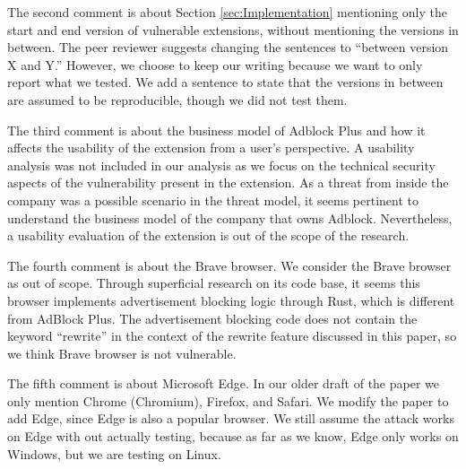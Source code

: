 \documentclass[conference]{IEEEtran}
\begin{document}
\begin{appendices}
The second comment is about Section \ref{sec:Implementation} mentioning only the start and end version of vulnerable extensions, without mentioning the versions in between. The peer reviewer suggests changing the sentences to ``between version X and Y.'' However, we choose to keep our writing because we want to only report what we tested. We add a sentence to state that the versions in between are assumed to be reproducible, though we did not test them.

The third comment is about the business model of Adblock Plus and how it affects the usability of the extension from a user's perspective. A usability analysis was not included in our analysis as we focus on the technical security aspects of the vulnerability present in the extension. As a threat from inside the company was a possible scenario in the threat model, it seems pertinent to understand the business model of the company that owns Adblock. Nevertheless, a usability evaluation of the extension is out of the scope of the research.

The fourth comment is about the Brave browser. We consider the Brave browser as out of scope. Through superficial research on its code base, it seems this browser implements advertisement blocking logic through Rust, which is different from AdBlock Plus. The advertisement blocking code does not contain the keyword ``rewrite'' in the context of the rewrite feature discussed in this paper, so we think Brave browser is not vulnerable.

The fifth comment is about Microsoft Edge. In our older draft of the paper we only mention Chrome (Chromium), Firefox, and Safari. We modify the paper to add Edge, since Edge is also a popular browser. We still assume the attack works on Edge with out actually testing, because as far as we know, Edge only works on Windows, but we are testing on Linux.

\end{appendices}
\end{document}
